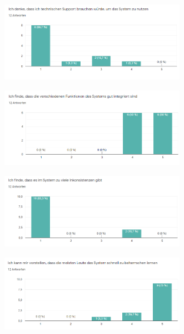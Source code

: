 \noChanges

\begin{figure}[H]
    \centering
    \includegraphics[width=0.7\textwidth]{media/survey/technicalSupport.png}
\end{figure}

\noChanges

\begin{figure}[H]
    \centering
    \includegraphics[width=0.7\textwidth]{media/survey/integrity.png}
\end{figure}

\noChanges

\begin{figure}[H]
    \centering
    \includegraphics[width=0.7\textwidth]{media/survey/inconsistent.png}
\end{figure}

\noChanges

\begin{figure}[H]
    \centering
    \includegraphics[width=0.7\textwidth]{media/survey/fastLearning.png}
\end{figure}

